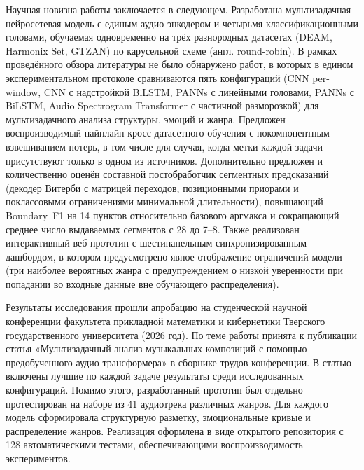 \results

\originality

Научная новизна работы заключается в следующем. Разработана мультизадачная нейросетевая модель с единым аудио-энкодером и четырьмя классификационными головами, обучаемая одновременно на трёх разнородных датасетах (DEAM, Harmonix Set, GTZAN) по карусельной схеме (англ. round-robin). В рамках проведённого обзора литературы не было обнаружено работ, в которых в едином экспериментальном протоколе сравниваются пять конфигураций (CNN per-window, CNN с надстройкой BiLSTM, PANNs с линейными головами, PANNs с BiLSTM, Audio Spectrogram Transformer с частичной разморозкой) для мультизадачного анализа структуры, эмоций и жанра. Предложен воспроизводимый пайплайн кросс-датасетного обучения с покомпонентным взвешиванием потерь, в том числе для случая, когда метки каждой задачи присутствуют только в одном из источников. Дополнительно предложен и количественно оценён составной постобработчик сегментных предсказаний (декодер Витерби с матрицей переходов, позиционными приорами и поклассовыми ограничениями минимальной длительности), повышающий Boundary~F1 на 14 пунктов относительно базового аргмакса и сокращающий среднее число выдаваемых сегментов с 28 до 7--8. Также реализован интерактивный веб-прототип с шестипанельным синхронизированным дашбордом, в котором предусмотрено явное отображение ограничений модели (три наиболее вероятных жанра с предупреждением о низкой уверенности при попадании во входные данные вне обучающего распределения).

\approbation

Результаты исследования прошли апробацию на студенческой научной конференции факультета прикладной математики и кибернетики Тверского государственного университета (2026 год). По теме работы принята к публикации статья «Мультизадачный анализ музыкальных композиций с помощью предобученного аудио-трансформера» в сборнике трудов конференции. В статью включены лучшие по каждой задаче результаты среди исследованных конфигураций. Помимо этого, разработанный прототип был отдельно протестирован на наборе из 41 аудиотрека различных жанров. Для каждого модель сформировала структурную разметку, эмоциональные кривые и распределение жанров. Реализация оформлена в виде открытого репозитория с 128 автоматическими тестами, обеспечивающими воспроизводимость экспериментов.

